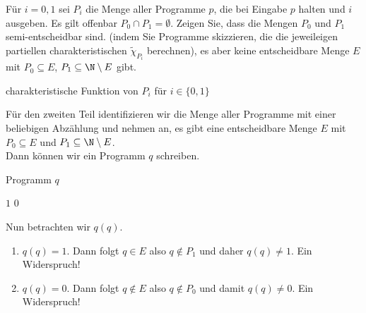
\begin{exercise}[224]

\phantom{}
	Für $i = 0,1$ sei $P_i$ die Menge aller Programme $p$, die bei Eingabe $p$ halten und $i$ ausgeben. Es gilt offenbar $P_0 \cap P_1 = \emptyset$. Zeigen Sie, dass die Mengen $P_0$ und $P_1$ semi-entscheidbar sind. (indem Sie Programme skizzieren, die die jeweileigen partiellen charakteristischen $\tilde{\chi}_{P_i}$ berechnen), es aber keine entscheidbare Menge $E$ mit $P_0 \subseteq E$, $P_1 \subseteq \N \setminus E$ gibt.

\end{exercise}


\begin{solution}

\phantom{}

	\begin{algorithm}
		\caption{charakteristische Funktion von $P_i$ für $i \in \{0,1\}$}
		\begin{algorithmic}[1]
					\State {}
				\EndIf
			\EndProcedure
		\end{algorithmic}
	\end{algorithm}

	Für den zweiten Teil identifizieren wir die Menge aller Programme mit einer
	beliebigen Abzählung und nehmen an, es gibt eine entscheidbare Menge
	$E$ mit $P_0 \subseteq E$ und $P_1 \subseteq \N \setminus E$. \\
	Dann können wir ein Programm $q$ schreiben.

	\begin{algorithm}
		\caption{Programm $q$}
		\begin{algorithmic}[1]
			\Procedure{$q$}{$p$}
				\If{$\chi_E(p) = 1$}
					\State \Return $1$
				\Else
					\State \Return$0$
				\EndIf
			\EndProcedure
		\end{algorithmic}
	\end{algorithm}

	Nun betrachten wir $q(q)$.
	\begin{enumerate}[label = Fall \arabic*:]
		\item $q(q) = 1$. Dann folgt $q \in E$ also $q \notin P_1$ und daher $q(q) \neq 1$. Ein Widerspruch!

		\item $q(q) = 0$. Dann folgt $q \notin E$ also $q \notin P_0$ und damit $q(q) \neq 0$. Ein Widerspruch!
	\end{enumerate}
\end{solution}
